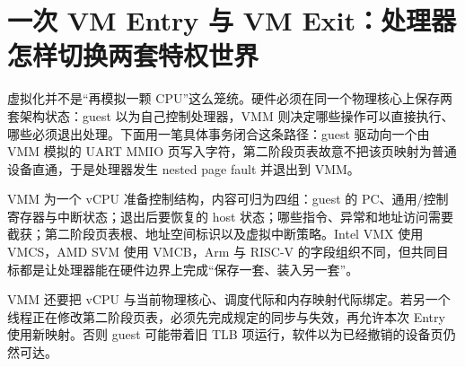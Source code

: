 \section{一次 VM Entry 与 VM Exit：处理器怎样切换两套特权世界}

虚拟化并不是“再模拟一颗 CPU”这么笼统。硬件必须在同一个物理核心上保存两套架构状态：guest 以为自己控制处理器，VMM 则决定哪些操作可以直接执行、哪些必须退出处理。下面用一笔具体事务闭合这条路径：guest 驱动向一个由 VMM 模拟的 UART MMIO 页写入字符，第二阶段页表故意不把该页映射为普通设备直通，于是处理器发生 nested page fault 并退出到 VMM。\cite{intel-sdm}


VMM 为一个 vCPU 准备控制结构，内容可归为四组：guest 的 PC、通用/控制寄存器与中断状态；退出后要恢复的 host 状态；哪些指令、异常和地址访问需要截获；第二阶段页表根、地址空间标识以及虚拟中断策略。Intel VMX 使用 VMCS，AMD SVM 使用 VMCB，Arm 与 RISC-V 的字段组织不同，但共同目标都是让处理器能在硬件边界上完成“保存一套、装入另一套”。

VMM 还要把 vCPU 与当前物理核心、调度代际和内存映射代际绑定。若另一个线程正在修改第二阶段页表，必须先完成规定的同步与失效，再允许本次 Entry 使用新映射。否则 guest 可能带着旧 TLB 项运行，软件以为已经撤销的设备页仍然可达。

